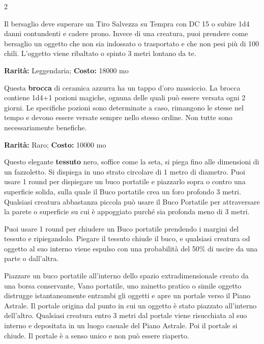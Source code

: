 \begin{multicols}{2}
\begin{itemize}[leftmargin=*]
Il bersaglio deve superare un Tiro Salvezza su Tempra con DC 15 o subire 1d4 danni contundenti e cadere prono. Invece di una creatura, puoi prendere come bersaglio un oggetto che non sia indossato o trasportato e che non pesi più di 100 chili. L'oggetto viene ribaltato o spinto 3 metri lontano da te.
\end{itemize}


\textbf{Rarità:} Leggendaria; \textbf{Costo:} 18000 mo

Questa \textbf{brocca} di ceramica azzurra ha un tappo d'oro massiccio. La brocca contiene 1d4+1 pozioni magiche, ognuna delle quali può essere versata ogni 2 giorni. Le specifiche pozioni sono determinate a caso, rimangono le stesse nel tempo e devono essere versate sempre nello stesso ordine. Non tutte sono necessariamente benefiche.


\textbf{Rarità:} Raro; \textbf{Costo:} 10000 mo

Questo elegante \textbf{tessuto} nero, soffice come la seta, si piega fino alle dimensioni di un fazzoletto. Si dispiega in uno strato circolare di 1 metro di diametro. Puoi usare 1 round per dispiegare un buco portatile e piazzarlo sopra o contro una superficie solida, sulla quale il Buco portatile crea un foro profondo 3 metri. Qualsiasi creatura abbastanza piccola può usare il Buco Portatile per attraversare la parete o superficie su cui è appoggiato purché sia profonda meno di 3 metri.

Puoi usare 1 round per chiudere un Buco portatile prendendo i margini del tessuto e ripiegandolo. Piegare il tessuto chiude il buco, e qualsiasi creatura od oggetto al suo interno viene espulso con una probabilità del 50\% di uscire da una parte o dall'altra.

Piazzare un buco portatile all'interno dello spazio extradimensionale creato da una borsa conservante, Vano portatile, uno zainetto pratico o simile oggetto distrugge istantaneamente entrambi gli oggetti e apre un portale verso il Piano Astrale. Il portale origina dal punto in cui un oggetto è stato piazzato all'interno dell'altro. Qualsiasi creatura entro 3 metri dal portale viene risucchiata al suo interno e depositata in un luogo casuale del Piano Astrale. Poi il portale si chiude. Il portale è a senso unico e non può essere riaperto.



\end{multicols}
